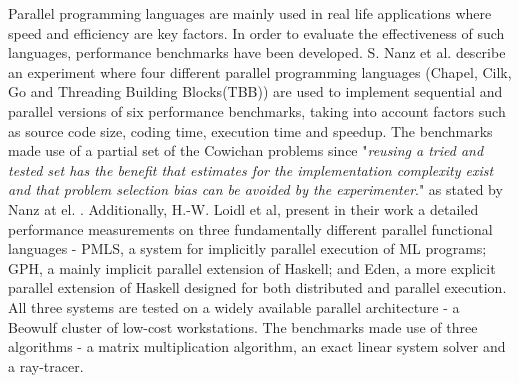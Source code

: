 Parallel programming languages are mainly used in real life applications where speed and efficiency are key factors. In order to evaluate the effectiveness of such languages, performance benchmarks have been developed. S. Nanz et al. \cite{MulticoreLangs} describe an experiment where four different parallel programming languages (Chapel, Cilk, Go and Threading Building Blocks(TBB)) are used to implement sequential and parallel versions of six performance benchmarks, taking into account factors such as source code size, coding time, execution time and speedup. The benchmarks made use of a partial set of the Cowichan problems \cite{CowichanProblems} since "\textit{reusing a tried and tested set has the benefit that
estimates for the implementation complexity exist and that
problem selection bias can be avoided by the experimenter}." as stated by Nanz at el. \cite{MulticoreLangs}. Additionally, H.-W. Loidl et al, present in their work a detailed performance measurements on three fundamentally different parallel functional languages -  PMLS, a system for implicitly parallel execution of ML programs; GPH, a mainly implicit parallel extension of Haskell; and Eden, a more explicit parallel extension of Haskell designed for both distributed and parallel execution. All three systems are tested on a widely available parallel architecture - a Beowulf cluster of low-cost workstations. The benchmarks made use of three algorithms - a matrix multiplication algorithm, an exact linear system solver and a ray-tracer. 

